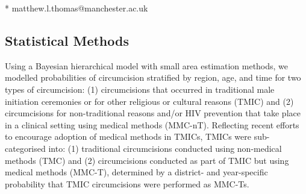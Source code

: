\documentclass{article}
\renewcommand{\thefigure}{S\arabic{figure}}
\renewcommand{\thetable}{S\arabic{table}}
\begin{document}
\vspace{-0.5cm}

* matthew.l.thomas@manchester.ac.uk
\newpage




\begin{appendix}


\newpage

\tableofcontents

\newpage


\section{Statistical Methods}
\label{sec::methods}


\noindent Using a Bayesian hierarchical model with small area estimation methods, we modelled probabilities of circumcision stratified by region, age, and time for two types of circumcision: (1) circumcisions that occurred in traditional male initiation ceremonies or for other religious or cultural reasons (TMIC) and (2) circumcisions for non-traditional reasons and/or HIV prevention that take place in a clinical setting using medical methods (MMC-nT). Reflecting recent efforts to encourage adoption of medical methods in TMICs, TMICs were sub-categorised into: (1) traditional circumcisions conducted using non-medical methods (TMC) and (2) circumcisions conducted as part of TMIC but using medical methods (MMC-T), determined by a district- and year-specific probability that TMIC circumcisions were performed as MMC-Ts.\\


\end{appendix}
\end{document}
